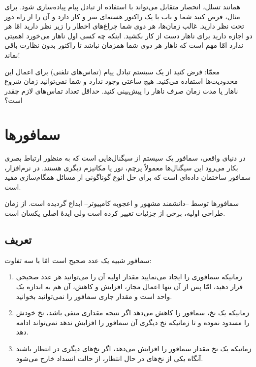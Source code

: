 \documentclass{book}
\newcommand{\clearemptydoublepage}{\newpage\cleardoublepage}
\begin{document}
    همانند تسلل، انحصار متقابل می‌تواند با استفاده از تبادل پیام پیاده‌سازی شود. برای مثال، فرض کنید شما و باب 
    با یک راکتور هسته‌ای سر و کار دارد و آن را از راه دور تحت نظر دارید. غالب زمان‌ها، هر دوی شما چراغ‌های اخطار را زیر نظر دارید 
    امّا هر دو اجازه دارید برای ناهار  دست از کار بکشید. 
    اینکه چه کسی اول ناهار می‌خورد اهمیتی ندارد امّا مهم است که ناهار هر دوی شما همزمان نباشد تا راکتور بدون نظارت باقی نماند!

    معمّا: فرض کنید از یک سیستم تبادل پیام (تماس‌های تلفنی) برای اعمال این محدودیت‌ها استفاده می‌کنید. 
    هیچ ساعتی وجود ندارد و شما نمی‌توانید زمان شروع ناهار یا مدت زمان صرف ناهار را پیش‌بینی کنید. 
    حداقل تعداد تماس‌های لازم چقدر است؟
    
\clearemptydoublepage
\chapter{سمافورها}

    در دنیای واقعی، سمافور یک سیستم از سیگنال‌هایی است که به منظور ارتباط بصری بکار می‌رود این سیگنال‌ها معمولاً پرچم،‌ نور یا مکانیزم دیگری هستند. 
    در نرم‌افزار، سمافور ساختمان داده‌ای است که برای حل انوع گوناگونی از مسائل همگام‌سازی مفید است.

    سمافورها توسط  --دانشمند مشهور و اعجوبه کامپیوتر-- ابداع گردیده است. 
    از زمان طراحی اولیه، برخی از جزئیات تغییر کرده است ولی ایدهٔ اصلی یکسان است. 

\section{تعریف}
    سمافور شبیه یک عدد صحیح است امّا با سه تفاوت: 

\begin{enumerate}

\item 
    زمانیکه سمافوری را ایجاد می‌نمایید مقدار اولیه آن را می‌توانید هر عدد صحیحی قرار دهید، 
    امّا پس از آن تنها اعمال مجاز، افزایش و کاهش، آن هم 
    به اندازه یک واحد است و مقدار جاری سمافور را نمی‌توانید بخوانید. 

\item 
    زمانیکه یک نخ، سمافور را کاهش می‌دهد اگر نتیجه  مقداری منفی باشد، نخ \space خودش را مسدود نموده 
    و تا زمانیکه نخ دیگری آن سمافور را افزایش ندهد نمی‌تواند ادامه دهد. 
\item 
    زمانیکه یک نخ مقدار سمافور را افزایش می‌دهد، اگر نخ‌های دیگری در انتظار باشند آنگاه یکی از نخ‌های در حال انتظار،‌ از حالت انسداد خارج می‌شود. 

\end{enumerate}
\end{document}
